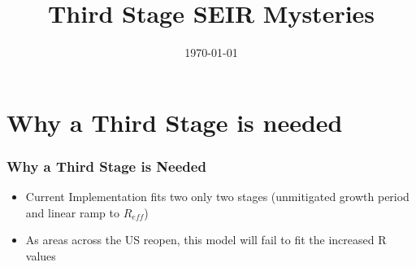 \documentclass{beamer}
\title[Third Stage SEIR]{Third Stage SEIR Mysteries} %
\date{\today} %
\newcommand{\oldestadj}{data/api-results-493/pyseir/myplots/}
\newcommand{\oldadj}{data/api-results-486/pyseir/myplots/}
\newcommand{\latestadj}{data/api-results-489/pyseir/myplots/}
\newcommand{\oldest}{data/api-results-492/pyseir/myplots/}
\newcommand{\old}{data/api-results-485/pyseir/myplots/}
\newcommand{\latest}{data/api-results-490/pyseir/myplots/}
\newcommand\makeslide[1]{
\begin{frame}%

    \begin{columns}
    \column{0.05\textwidth}
    \tiny Adjusted R\\ 
    \vspace{3cm}
    \tiny Not-Adjusted R
     \column{0.33\textwidth}
       \texttt{[image: \\oldestadj mle\_fit\_results\_\_\#1.pdf]} \\  
        \texttt{[image: \\oldest mle\_fit\_results\_\_\#1.pdf]}   
       \captionof{figure}{June 10}   
        \column{0.33\textwidth}
       \texttt{[image: \\oldadj mle\_fit\_results\_\_\#1.pdf]}  \\ 
        \texttt{[image: \\old mle\_fit\_results\_\_\#1.pdf]}  

       \captionof{figure}{June 11}   
        \column{0.33\textwidth} 
        \texttt{[image: \\latestadj mle\_fit\_results\_\_\#1.pdf]}  \\ 
        \texttt{[image: \\latest mle\_fit\_results\_\_\#1.pdf]}  

       \captionof{figure}{June 12}  
\end{columns}
\end{frame}
}
\begin{document}
\begin{frame}
\titlepage %
\end{frame}


\iffalse
\begin{frame}
\tableofcontents
\end{frame}
\fi

\iffalse
\section{Why a Third Stage is needed} %
\begin{frame}
\frametitle{Why a Third Stage is Needed}
\begin{itemize}[label={-}]
\item Current Implementation fits two only two stages (unmitigated growth period and linear ramp to $R_{eff}$)
\item As areas across the US reopen, this model will fail to fit the increased R values

\end{itemize}
\end{frame}
\end{document}
